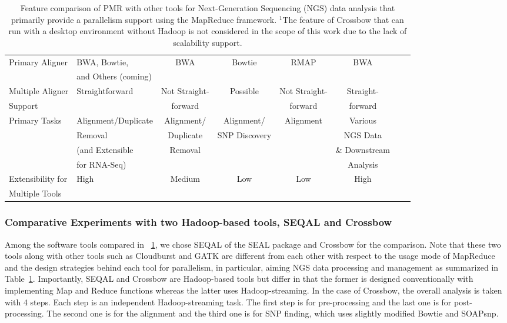 \documentclass{sig-alternate}
\begin{document}
\begin{center}
\begin{table}[ht]
{\begin{tabular}{|l|l|c|c|c|c|c|c|}
Primary Aligner &  BWA, Bowtie,  &  BWA & Bowtie & RMAP &  BWA \\
& and Others (coming) &  &  &  &  \\ \hline
Multiple Aligner  & Straightforward & Not Straight- & Possible & Not Straight-  & Straight-  \\ 
Support &  & forward &   & forward  & forward \\\hline
Primary Tasks & Alignment/Duplicate  & Alignment/ & Alignment/ & Alignment &Various\\
  &  Removal & Duplicate & SNP Discovery & & NGS Data  \\  
           & (and Extensible &  Removal & &  & \& Downstream  \\
           & for RNA-Seq) & & &  & Analysis \\ \hline  
Extensibility for   &  High  & Medium &  Low & Low & High      \\
Multiple Tools  &      &  &  &  &   \\ \hline

\hline
\end{tabular}}
\hfill{}
\caption{Feature comparison of PMR with other tools for Next-Generation Sequencing (NGS) data analysis that primarily provide a parallelism support using the MapReduce framework.  $^{1}${The feature of Crossbow that can run with a desktop environment without Hadoop is not considered in the scope of this work due to the lack of scalability support.} }
 \label{table:mr-comparison}
\end{table}
\end{center}

\subsubsection{Comparative Experiments with two Hadoop-based tools, SEQAL and Crossbow}
Among the software tools compared in ~\ref{table:mr-comparison}, we chose SEQAL of the SEAL package and Crossbow for the comparison.  Note that these two tools along with other tools such as Cloudburst and GATK are different from each other with respect to the usage mode of MapReduce and the design strategies behind each tool for parallelism, in particular, aiming NGS data processing and management as summarized in Table~\ref{table:mr-comparison}.  Importantly, SEQAL and Crossbow are Hadoop-based tools but differ in that the former is designed conventionally with implementing Map and Reduce functions whereas the latter uses Hadoop-streaming.  In the case of Crossbow, the overall analysis is taken with 4 steps.  Each step is an independent Hadoop-streaming task.  The first step is for pre-processing and the last one is for post-processing. The second one is for the alignment and the third one is for SNP finding, which uses slightly modified Bowtie and SOAPsnp.  
\end{document}
